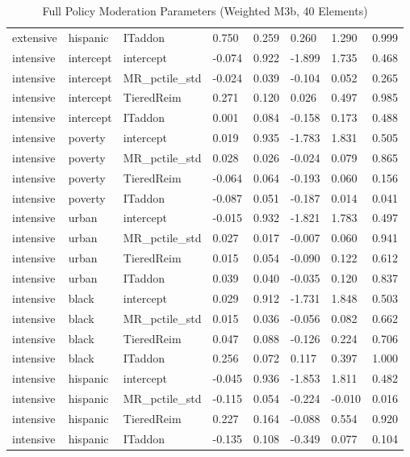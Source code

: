 \begin{table}[htbp]
\begin{tabular}{llllllll}
  extensive & hispanic & ITaddon & 0.750 & 0.259 & 0.260 & 1.290 & 0.999 \\ 
  intensive & intercept & intercept & -0.074 & 0.922 & -1.899 & 1.735 & 0.468 \\ 
  intensive & intercept & MR_pctile_std & -0.024 & 0.039 & -0.104 & 0.052 & 0.265 \\ 
  intensive & intercept & TieredReim & 0.271 & 0.120 & 0.026 & 0.497 & 0.985 \\ 
  intensive & intercept & ITaddon & 0.001 & 0.084 & -0.158 & 0.173 & 0.488 \\ 
  intensive & poverty & intercept & 0.019 & 0.935 & -1.783 & 1.831 & 0.505 \\ 
  intensive & poverty & MR_pctile_std & 0.028 & 0.026 & -0.024 & 0.079 & 0.865 \\ 
  intensive & poverty & TieredReim & -0.064 & 0.064 & -0.193 & 0.060 & 0.156 \\ 
  intensive & poverty & ITaddon & -0.087 & 0.051 & -0.187 & 0.014 & 0.041 \\ 
  intensive & urban & intercept & -0.015 & 0.932 & -1.821 & 1.783 & 0.497 \\ 
  intensive & urban & MR_pctile_std & 0.027 & 0.017 & -0.007 & 0.060 & 0.941 \\ 
  intensive & urban & TieredReim & 0.015 & 0.054 & -0.090 & 0.122 & 0.612 \\ 
  intensive & urban & ITaddon & 0.039 & 0.040 & -0.035 & 0.120 & 0.837 \\ 
  intensive & black & intercept & 0.029 & 0.912 & -1.731 & 1.848 & 0.503 \\ 
  intensive & black & MR_pctile_std & 0.015 & 0.036 & -0.056 & 0.082 & 0.662 \\ 
  intensive & black & TieredReim & 0.047 & 0.088 & -0.126 & 0.224 & 0.706 \\ 
  intensive & black & ITaddon & 0.256 & 0.072 & 0.117 & 0.397 & 1.000 \\ 
  intensive & hispanic & intercept & -0.045 & 0.936 & -1.853 & 1.811 & 0.482 \\ 
  intensive & hispanic & MR_pctile_std & -0.115 & 0.054 & -0.224 & -0.010 & 0.016 \\ 
  intensive & hispanic & TieredReim & 0.227 & 0.164 & -0.088 & 0.554 & 0.920 \\ 
  intensive & hispanic & ITaddon & -0.135 & 0.108 & -0.349 & 0.077 & 0.104 \\ 
   \bottomrule
\end{tabular}
\caption{Full Policy Moderation Parameters (Weighted M3b, 40 Elements)} 
\end{table}
